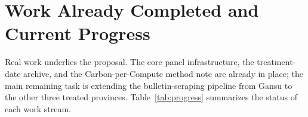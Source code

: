 \documentclass[12pt,a4paper]{article}
\begin{document}
%

\section{Work Already Completed and Current Progress}

Real work underlies the proposal. The core panel infrastructure, the
treatment-date archive, and the Carbon-per-Compute method note are
already in place; the main remaining task is extending the
bulletin-scraping pipeline from Gansu to the other three treated
provinces. Table~\ref{tab:progress} summarizes the status of each
work stream.
\end{document}
